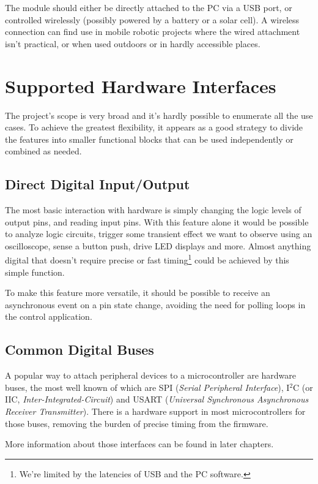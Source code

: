 The module should either be directly attached to the PC via a USB port, or controlled wirelessly (possibly powered by a battery or a solar cell). A wireless connection can find use in mobile robotic projects where the wired attachment isn't practical, or when used outdoors or in hardly accessible places.

\section{Supported Hardware Interfaces}

The project's scope is very broad and it's hardly possible to enumerate all the use cases. To achieve the greatest flexibility, it appears as a good strategy to divide the features into smaller functional blocks that can be used independently or combined as needed.

\subsection{Direct Digital Input/Output}

The most basic interaction with hardware is simply changing the logic levels of output pins, and reading input pins. With this feature alone it would be possible to analyze logic circuits, trigger some transient effect we want to observe using an oscilloscope, sense a button push, drive LED displays and more. Almost anything digital that doesn't require precise or fast timing\footnote{We're limited by the latencies of USB and the PC software.} could be achieved by this simple function.

To make this feature more versatile, it should be possible to receive an asynchronous event on a pin state change, avoiding the need for polling loops in the control application.

\subsection{Common Digital Buses}

A popular way to attach peripheral devices to a microcontroller are hardware buses, the most well known of which are SPI (\textit{Serial Peripheral Interface}), I$^2$C (or IIC, \textit{Inter-Integrated-Circuit}) and USART (\textit{Universal Synchronous Asynchronous Receiver Transmitter}). There is a hardware support in most microcontrollers for those buses, removing the burden of precise timing from the firmware.

More information about those interfaces can be found in later chapters. 

